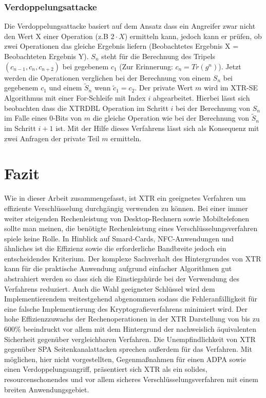 \documentclass[10pt,        %
               a4paper,     %
               journal,     %
               ]{IEEEtran}
\begin{document}
\subsubsection{Verdoppelungsattacke}
Die Verdoppelungsattacke basiert auf dem Ansatz dass ein Angreifer zwar nicht den Wert X einer Operation (z.B $2\cdot X$) ermitteln kann, jedoch kann er prüfen, ob zwei Operationen das gleiche Ergebnis liefern (Beobachtetes Ergebnis X = Beobachteten Ergebnis Y).
$S_n$ steht für die Berechnung des Tripels $(c_{n-1},c_{n},c_{n+2})$ bei gegebenem $c_1$ (Zur Erinnerung: $c_n = Tr(g^n)$).
Jetzt werden die Operationen verglichen bei der Berechnung von einem $S_n$ bei gegebenem $c_1$ und einem $\tilde{S}_n$ wenn $\tilde{c}_1 = c_2$.
Der private Wert $m$ wird im XTR-SE Algorithmus mit einer For-Schleife mit Index $i$ abgearbeitet. Hierbei lässt sich beobachten dass die XTRDBL Operation im Schritt $i$ bei der Berechnung von $S_n$ im Falle eines 0-Bits von $m$ die gleiche Operation wie bei der Berechnung von $\tilde{S}_n$ im Schritt $i+1$ ist. Mit der Hilfe dieses Verfahrens lässt sich als Konsequenz mit zwei Anfragen der private Teil $m$ ermitteln.\cite{side-channel2}



\section{Fazit}
Wie in dieser Arbeit zusammengefasst, ist XTR ein geeignetes Verfahren um effiziente Verschlüsselung durchgängig verwenden zu können. 
Bei einer immer weiter steigenden Rechenleistung von Desktop-Rechnern sowie Mobiltelefonen sollte man meinen, die benötigte Rechenleistung eines
Verschlüsselungsverfahren spiele keine Rolle. In Hinblick auf Smard-Cards, NFC-Anwendungen und ähnliches ist die Effizienz sowie die erforderliche Bandbreite jedoch ein entscheidendes Kriterium. Der komplexe Sachverhalt des Hintergrundes von XTR kann für die praktische Anwendung aufgrund
einfacher Algorithmen gut abstrahiert werden so dass sich die Einstiegshürde bei der Verwendung des Verfahrens reduziert. Auch die Wahl geeigneter Schlüssel wird dem Implementierendem weitestgehend abgenommen sodass die Fehleranfälligkeit für eine falsche Implementierung des Kryptografieverfahrens minimiert wird. Der hohe Effizienzzuwachs der Rechenoperationen in der XTR Darstellung von bis zu 600\% beeindruckt vor allem mit dem Hintergrund der nachweislich äquivalenten Sicherheit gegenüber vergleichbaren Verfahren. Die Unempfindlichkeit von XTR gegenüber SPA Seitenkanalattacken sprechen außerdem für das Verfahren. Mit möglichen, hier nicht vorgestellten, Gegenmaßnahmen für einen ADPA sowie einen Verdoppelungsangriff, präsentiert sich XTR als ein solides, resourcenschonendes und vor allem sicheres Verschlüsselungsverfahren mit einem breiten Anwendungsgebiet.
\end{document}
